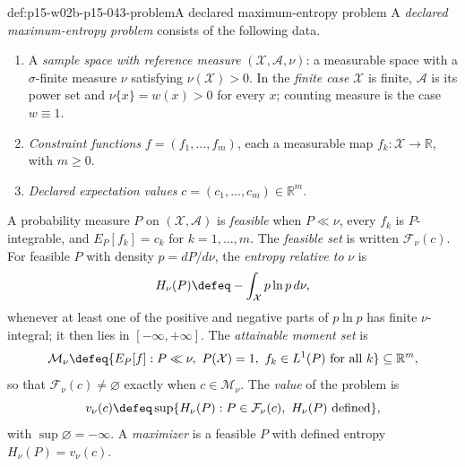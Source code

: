 \begin{hbdefinition}{def:p15-w02b-p15-043-problem}{A declared maximum-entropy problem}
A \emph{declared maximum-entropy problem} consists of the following data.
\begin{enumerate}
\item A \emph{sample space with reference measure}
\((\mathcal X,\mathcal A,\nu)\): a measurable space with a
\(\sigma\)-finite measure \(\nu\) satisfying \(\nu(\mathcal X)>0\).
In the \emph{finite case} \(\mathcal X\) is finite,
\(\mathcal A\) is its power set and \(\nu\{x\}=w(x)>0\) for every
\(x\); counting measure is the case \(w\equiv1\).
\item \emph{Constraint functions} \(f=(f_1,\ldots,f_m)\), each a
measurable map \(f_k:\mathcal X\to\mathbb R\), with \(m\geq0\).
\item \emph{Declared expectation values} \(c=(c_1,\ldots,c_m)\in\mathbb R^m\).
\end{enumerate}
A probability measure \(P\) on \((\mathcal X,\mathcal A)\) is
\emph{feasible} when \(P\ll\nu\), every \(f_k\) is \(P\)-integrable,
and \(E_P[f_k]=c_k\) for \(k=1,\ldots,m\). The \emph{feasible set} is
written \(\mathcal F_\nu(c)\). For feasible \(P\) with density
\(p=dP/d\nu\), the \emph{entropy relative to} \(\nu\) is
\[
 H_\nu(P)\defeq-\int_{\mathcal X}p\ln p\,d\nu ,
\]
whenever at least one of the positive and negative parts of \(p\ln p\)
has finite \(\nu\)-integral; it then lies in \([-\infty,+\infty]\).
The \emph{attainable moment set} is
\[
 \mathcal M_\nu\defeq\{E_P[f]: P\ll\nu,\ P(\mathcal X)=1,\
 f_k\in L^1(P)\text{ for all }k\}\subseteq\mathbb R^m ,
\]
so that \(\mathcal F_\nu(c)\neq\varnothing\) exactly when
\(c\in\mathcal M_\nu\). The \emph{value} of the problem is
\[
 v_\nu(c)\defeq\sup\{H_\nu(P):P\in\mathcal F_\nu(c),\ H_\nu(P)\text{ defined}\},
\]
with \(\sup\varnothing=-\infty\). A \emph{maximizer} is a feasible \(P\)
with defined entropy \(H_\nu(P)=v_\nu(c)\).
\end{hbdefinition}

